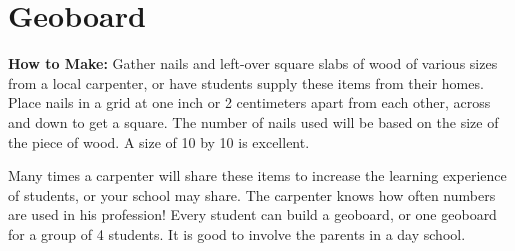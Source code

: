 \section{Geoboard} \label{geoboard}
\textbf{How to Make:} Gather nails and left-over square slabs of wood of various sizes from a local carpenter, or have students supply these items from their homes. Place nails in a grid at one inch or 2 centimeters apart from each other, across and down to get a square. The number of nails used will be based on the size of the piece of wood. A size of 10 by 10 is excellent. 

Many times a carpenter will share these items to increase the learning experience of students, or your school may share. The carpenter knows how often numbers are used in his profession! Every student can build a geoboard, or one geoboard for a group of 4 students. It is good to involve the parents in a day school.\\

